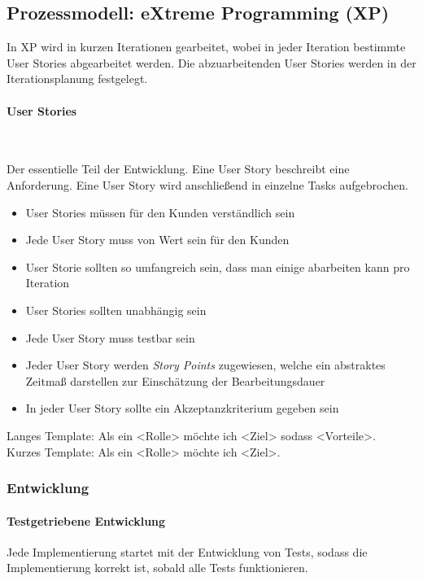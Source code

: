 \documentclass[ngerman,color=3b]{tuda_summary}
\begin{document}
\subsection{Prozessmodell: eXtreme Programming (XP)}
In XP wird in kurzen Iterationen gearbeitet, wobei in jeder Iteration bestimmte User Stories abgearbeitet werden. Die abzuarbeitenden User Stories werden in der Iterationsplanung festgelegt.

\paragraph{User Stories}\mbox{}\\
\begin{definition}
    Der essentielle Teil der Entwicklung. Eine User Story beschreibt eine Anforderung. Eine User Story wird anschließend in einzelne Tasks aufgebrochen.
\end{definition}

\begin{itemize}
    \item User Stories müssen für den Kunden verständlich sein
    \item Jede User Story muss von Wert sein für den Kunden
    \item User Storie sollten so umfangreich sein, dass man einige abarbeiten kann pro Iteration
    \item User Stories sollten unabhängig sein
    \item Jede User Story muss testbar sein
    \item Jeder User Story werden \textit{Story Points} zugewiesen, welche ein abstraktes Zeitmaß darstellen zur Einschätzung der Bearbeitungsdauer
    \item In jeder User Story sollte ein Akzeptanzkriterium gegeben sein
\end{itemize}

\noindent Langes Template: Als ein <Rolle> möchte ich <Ziel> sodass <Vorteile>. \\
Kurzes Template: Als ein <Rolle> möchte ich <Ziel>.
\clearpage
\subsubsection{Entwicklung}
\paragraph{Testgetriebene Entwicklung}
Jede Implementierung startet mit der Entwicklung von Tests, sodass die Implementierung korrekt ist, sobald alle Tests funktionieren.
\end{document}
